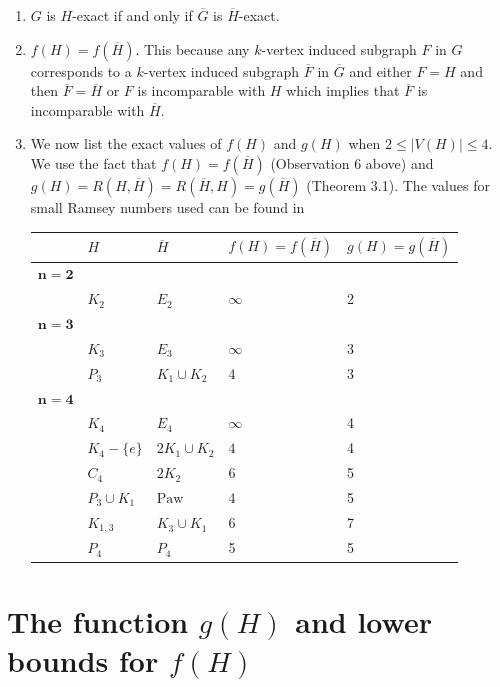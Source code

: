 \documentclass[a4paper,12pt]{article}
\newcommand{\Leg}{\operatorname{Leg}}%
\begin{document}
\begin{enumerate}
 \item $G$ is $H$-exact if and only if $\overline{G}$ is $\overline{H}$-exact.
\item
$f(H) = f(\overline{H})$.  This because any $k$-vertex induced subgraph
$F$ in $G$ corresponds to a $k$-vertex induced subgraph $\overline{F}$ in $\overline{G}$ and either $F = H$ and then $\overline{F}=\overline{H}$ or $F$ is incomparable with $H$ which implies that $\overline{F}$ is incomparable with $\overline{H}$. 
\item{We now list the exact values of $f(H)$ and $g(H)$ when $2 \leq |V(H)| \leq 4$.  We use the fact that $f(H)=f(\overline{H})$ (Observation 6 above) and $g(H) = R(H, \overline{H}) = R(\overline{H}, H) = g(\overline{H})$ (Theorem 3.1). The values for small Ramsey numbers used can be found in \cite{Chvtal1972GeneralizedRT}
\begin{center}
\begin{tabular}{ |p{2cm}|p{2cm}|p{2cm}|p{3cm}| p{3cm}| }
 \hline
&$H$& $\overline{H}$ &$f(H)=f(\overline{H})$& $g(H)=g(\overline{H})$\\
\hline 
 $\mathbf{n=2}$& & & &\\
\hline
&$K_2$ &$E_2$ &$\infty$&2\\
 \hline 
 $\mathbf{n=3}$& & & &\\
\hline
&$K_3$ &$E_3$ &$\infty$&3\\
&$P_3$&$K_1 \cup K_2$&4 &3\\
\hline 
 $\mathbf{n=4}$& & & &\\
\hline
&$K_4$ &$E_4$ &$\infty$&4\\
&$K_4 - \{e\}$ &$2K_1 \cup K_2$ &$4$&4\\
&$C_4$ &$2K_2$ &$6$&5\\
&$P_3 \cup K_1$ &$\text{Paw}$&4&5\\
&$K_{1,3}$ &$K_3 \cup K_1$ &6&7\\
&$P_4$&$P_4$&5 &5\\
\hline 
\end{tabular}
	\end{center}}
\end{enumerate}



\section{The function $g(H)$ and lower bounds for $f(H)$}
\end{document}
